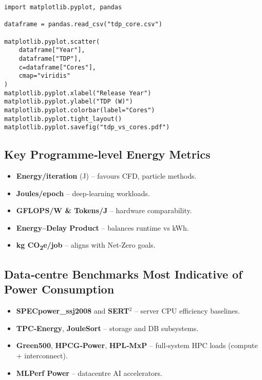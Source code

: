 \begin{lstlisting}[style=pystyle,
       basicstyle=\sffamily\footnotesize,
       xleftmargin=2em, xrightmargin=1em,
                   caption={Python script that produces
                            Fig.~\ref{fig:tdp_scatter}.},
                   label={lst:tdp_py}]
import matplotlib.pyplot, pandas

dataframe = pandas.read_csv("tdp_core.csv")

matplotlib.pyplot.scatter(
    dataframe["Year"],
    dataframe["TDP"],
    c=dataframe["Cores"],
    cmap="viridis"
)
matplotlib.pyplot.xlabel("Release Year")
matplotlib.pyplot.ylabel("TDP (W)")
matplotlib.pyplot.colorbar(label="Cores")
matplotlib.pyplot.tight_layout()
matplotlib.pyplot.savefig("tdp_vs_cores.pdf")
\end{lstlisting}

\subsection{Key Programme‑level Energy Metrics}

\begin{itemize}
  \item \textbf{Energy/iteration} (J) – favours CFD, particle methods.
  \item \textbf{Joules/epoch} – deep‑learning workloads.
  \item \textbf{GFLOPS/W \& Tokens/J} – hardware comparability.
  \item \textbf{Energy–Delay Product} – balances runtime vs kWh.
  \item \textbf{kg CO\textsubscript{2}e/job} – aligns with Net‑Zero goals.
\end{itemize}

\subsection{Data‑centre Benchmarks Most Indicative of Power Consumption}

\begin{itemize}
  \item \textbf{SPECpower\_ssj2008} and \textbf{SERT$^{2}$}
        – server CPU efficiency baselines.
  \item \textbf{TPC‑Energy}, \textbf{JouleSort}
        – storage and DB subsystems.
  \item \textbf{Green500}, \textbf{HPCG‑Power}, \textbf{HPL‑MxP}
        – full‑system HPC loads (compute + interconnect).
  \item \textbf{MLPerf Power} – datacentre AI accelerators.
\end{itemize}

